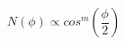 \documentclass[12pt]{article}
\begin{document}
$$
	N(\phi) \propto cos^{m} \left(\frac{\phi}{2}\right)
$$
\end{document}
